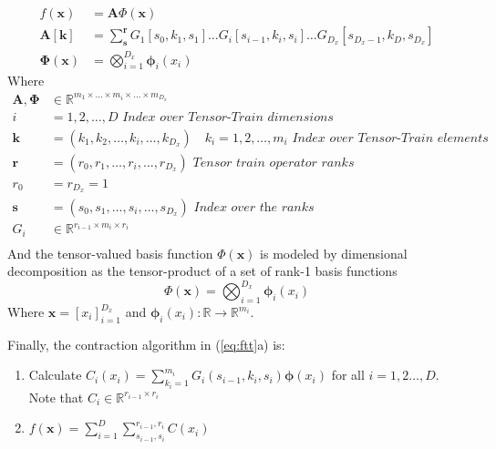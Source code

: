 \documentclass[11pt]{article}
\begin{document}
    \begin{subequations}
        \label{eq:ftt}
        \begin{align}
            f(\mathbf{x}) &= \bm{A}\Phi(\mathbf{x}) \label{ftt1}\\
            \bm{A}[\bm{k}] &= \sum_{\bm{s}}^{\bm{r}} G_1[s_0,k_1, s_1]\dots G_i[s_{i-1},k_i, s_i] \dots G_{D_x}[s_{D_x-1},k_D, s_{D_x}]\\
            \bm{\Phi}(\mathbf{x})&=\bigotimes_{i=1}^{D_x} \bm{\phi}_i(x_i)
        \end{align}
    \end{subequations}
    Where
    \begin{align*}
        \mathbf{A},\bm{\Phi} &\in \mathbb{R}^{m_1 \times \dots \times m_{i}\times \dots \times m_{D_x}} \\
        i&=1,2,\dots,D \textit{  Index over Tensor-Train dimensions}\\
        \bm{k}&=(k_1,k_2,\dots,k_i,\dots,k_{D_x}) \quad k_i=1,2,\dots,m_i \textit{  Index over Tensor-Train elements}\\
        \bm{r}&=(r_0,r_1,\dots,r_i,\dots,r_{D_x}) \textit{  Tensor train operator ranks}\\
        r_{0}&=r_{D_x}=1 \\
        \bm{s}&=(s_0,s_1,\dots,s_i,\dots,s_{D_x}) \textit{  Index over the ranks}\\
        G_i &\in \mathbb{R}^{r_{i-1} \times m_i \times r_i}\\
    \end{align*}
    And the tensor-valued basis function $\Phi(\mathbf{x})$ is modeled by dimensional decomposition as the tensor-product
    of a set of rank-1 basis functions
    \begin{equation}
        \label{eq:ftt-basis-fn-decomp}
        \Phi(\mathbf{x}) = \bigotimes_{i=1}^{D_x} \bm{\phi}_i(x_i)
    \end{equation}
    Where $\bm{x}=[x_i]_{i=1}^{D_x}$ and $\bm{\phi}_i(x_i) : \mathbb{R}\rightarrow\mathbb{R}^{m_i}$.
    \par
    Finally, the contraction algorithm in (\ref{eq:ftt}a) is:
    \begin{enumerate}
        \item Calculate $C_i(x_i) = \sum_{k_i=1}^{m_i} G_i(s_{i-1},k_i,s_i) \bm{\phi}(x_i)$ for all $i=1,2\dots,D$.
        Note that  $C_i \in \mathbb{R}^{r_{i-1} \times r_i}$
        \item $f(\mathbf{x}) = \sum_{i=1}^{D}\sum_{s_{i-1},s_i}^{r_{i-1},r_i} C(x_i)$
    \end{enumerate}
\end{document}
